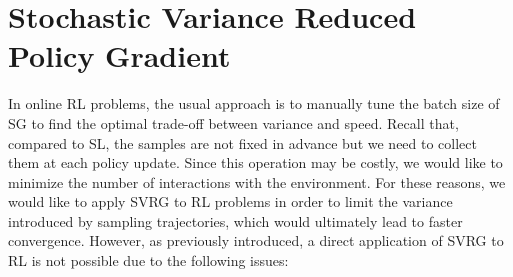 \chapter{Stochastic Variance Reduced Policy Gradient} \label{chap:algorithm}
\vspace{-0.05in}
In online \acs{RL} problems, the usual approach is to manually tune the batch size of \acs{SG} to find the optimal trade-off between variance and speed.
Recall that, compared to \acs{SL}, the samples are not fixed in advance but we need to collect them at each policy update.
Since this operation may be costly, we would like to minimize the number of interactions with the environment.
For these reasons, we would like to apply \acs{SVRG} to \acs{RL} problems in order to limit the variance introduced by sampling trajectories, which would ultimately lead to faster convergence.
However, as previously introduced, a direct application of \acs{SVRG} to \acs{RL} is not possible due to the following issues:
